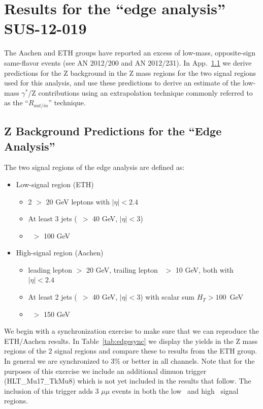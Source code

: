 \clearpage
\section{Results for the ``edge analysis'' SUS-12-019}
\label{sec:edge}

The Aachen and ETH groups have reported an excess of low-mass, opposite-sign same-flavor events (see AN 2012/200 and AN 2012/231).
In App.~\ref{sec:edge_templates} we derive predictions for the Z background in the Z mass regions for the two signal regions used for this analysis,
and use these predictions to derive an estimate of the low-mass $\gamma^*$/Z contributions using an extrapolation technique
commonly referred to as the ``$R_{out/in}$'' technique.


\subsection{Z Background Predictions for the ``Edge Analysis''}
\label{sec:edge_templates}

The two signal regions of the edge analysis are defined as:

\begin{itemize}
\item Low-\MET signal region (ETH)
  \begin{itemize}
  \item 2 \pt $>$ 20 GeV leptons with $|\eta|<2.4$
  \item At least 3 jets (\pt\ $>$ 40 GeV, $|\eta|<3$)
  \item \MET\ $>$ 100 GeV
  \end{itemize}
\item High-\MET signal region (Aachen)
  \begin{itemize}
  \item leading lepton \pt $>$ 20 GeV, trailing lepton \pt\ $>$ 10 GeV, both with $|\eta|<2.4$
  \item At least 2 jets (\pt\ $>$ 40 GeV, $|\eta|<3$) with scalar sum $H_{T}>100$~GeV
  \item \MET\ $>$ 150 GeV
  \end{itemize}
\end{itemize}

We begin with a synchronization exercise to make sure that we can reproduce the ETH/Aachen results. In Table~\ref{tab:edgesync} we
display the yields in the Z mass regions of the 2 signal regions and compare these to results from the ETH group.
In general we are synchronized to 3\% or better in all channels. Note that for the purposes of this exercise we include an additional
dimuon trigger (HLT\_Mu17\_TkMu8) which is not yet included in the results that follow. The inclusion of this trigger adds 3 $\mu\mu$
events in both  the low \MET\ and high \MET\ signal regions.


